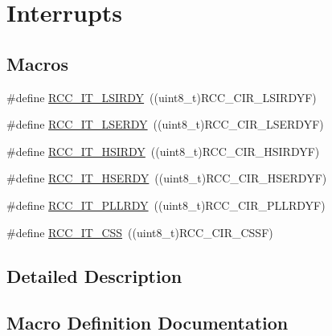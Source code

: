 \hypertarget{group___r_c_c___interrupt}{}\section{Interrupts}
\label{group___r_c_c___interrupt}
\subsection*{Macros}
\begin{DoxyCompactItemize}
\item 
\#define \hyperlink{group___r_c_c___interrupt_ga2b4ef277c1b71f96e0bef4b9a72fca94}{R\+C\+C\+\_\+\+I\+T\+\_\+\+L\+S\+I\+R\+DY}~((uint8\+\_\+t)R\+C\+C\+\_\+\+C\+I\+R\+\_\+\+L\+S\+I\+R\+D\+YF)
\item 
\#define \hyperlink{group___r_c_c___interrupt_gad6b6e78a426850f595ef180d292a673d}{R\+C\+C\+\_\+\+I\+T\+\_\+\+L\+S\+E\+R\+DY}~((uint8\+\_\+t)R\+C\+C\+\_\+\+C\+I\+R\+\_\+\+L\+S\+E\+R\+D\+YF)
\item 
\#define \hyperlink{group___r_c_c___interrupt_ga69637e51b71f73f519c8c0a0613d042f}{R\+C\+C\+\_\+\+I\+T\+\_\+\+H\+S\+I\+R\+DY}~((uint8\+\_\+t)R\+C\+C\+\_\+\+C\+I\+R\+\_\+\+H\+S\+I\+R\+D\+YF)
\item 
\#define \hyperlink{group___r_c_c___interrupt_gad13eaede352bca59611e6cae68665866}{R\+C\+C\+\_\+\+I\+T\+\_\+\+H\+S\+E\+R\+DY}~((uint8\+\_\+t)R\+C\+C\+\_\+\+C\+I\+R\+\_\+\+H\+S\+E\+R\+D\+YF)
\item 
\#define \hyperlink{group___r_c_c___interrupt_ga68d48e7811fb58f2649dce6cf0d823d9}{R\+C\+C\+\_\+\+I\+T\+\_\+\+P\+L\+L\+R\+DY}~((uint8\+\_\+t)R\+C\+C\+\_\+\+C\+I\+R\+\_\+\+P\+L\+L\+R\+D\+YF)
\item 
\#define \hyperlink{group___r_c_c___interrupt_ga9bb34a4912d2084dc1c0834eb53aa7a3}{R\+C\+C\+\_\+\+I\+T\+\_\+\+C\+SS}~((uint8\+\_\+t)R\+C\+C\+\_\+\+C\+I\+R\+\_\+\+C\+S\+SF)
\end{DoxyCompactItemize}


\subsection{Detailed Description}


\subsection{Macro Definition Documentation}
\mbox{\label{group___r_c_c___interrupt_ga9bb34a4912d2084dc1c0834eb53aa7a3}} 
